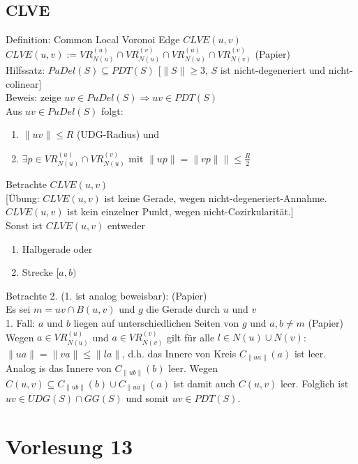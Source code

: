 \documentclass{article}
\begin{document}
\subsection*{CLVE}
Definition: Common Local Voronoi Edge $CLVE(u,v)$ \\
$CLVE(u,v) := VR^{(u)}_{N(u)} \cap VR_{N(u)}^{(v)} \cap VR_{N(u)}^{(u)}
\cap VR_{N(v)}^{(v)}$ (Papier) \\
Hilfssatz: $PuDel(S) \subseteq PDT(S)$ [$\|S\| \geq 3$, $S$ ist
nicht-degeneriert und nicht-colinear] \\
Beweis: zeige $uv \in PuDel(S) \Rightarrow uv \in PDT(S)$ \\
Aus $uv \in PuDel(S)$ folgt:
\begin{enumerate}
	\item $\|uv\| \leq R$ (UDG-Radius) und
	\item $\exists p \in VR_{N(u)}^{(u)} \cap VR_{N(u)}^{(v)}$ mit $\|up\| =
	\|vp\| \| \leq \frac{R}{2}$
\end{enumerate}
Betrachte $CLVE(u,v)$ \\
{[}Übung: $CLVE(u,v)$ ist keine Gerade, wegen nicht-degeneriert-Annahme.
$CLVE(u,v)$ ist kein einzelner Punkt, wegen nicht-Cozirkularität.] \\
Sonst ist $CLVE(u,v)$ entweder
\begin{enumerate}
	\item Halbgerade oder
	\item Strecke $[a,b)$
\end{enumerate}
Betrachte 2. (1. ist analog beweisbar): (Papier) \\
Es sei $m = uv \cap B(u,v)$ und $g$ die Gerade durch $u$ und $v$ \\
1. Fall: $a$ und $b$ liegen auf unterschiedlichen Seiten von $g$ und
$a,b \neq m$ (Papier) \\
Wegen $a \in VR_{N(u)}^{(u)}$ und $a \in VR_{N(v)}^{(v)}$ gilt für alle
$l \in N(u) \cup N(v)$: $\|ua\| = \|va\| \leq \|la\|$, d.h. das Innere
von Kreis $C_{\|ua\|}(a)$ ist leer. Analog is das Innere von
$C_{\|ub\|}(b)$ leer. Wegen $C(u,v) \subseteq C_{\|ub\|}(b) \cup
C_{\|ua\|}(a)$ ist damit auch $C(u,v)$ leer. Folglich ist $uv \in UDG(S)
\cap GG(S)$ und somit $uv \in PDT(S)$.

\section{Vorlesung 13}
\end{document}
